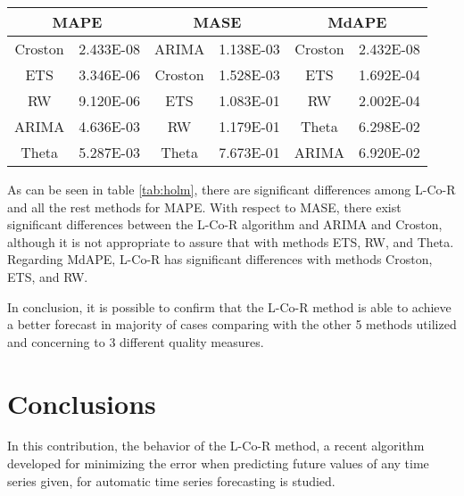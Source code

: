\documentclass[a4paper,twoside]{article}
\newcommand{\metodo}{L-Co-R}
\begin{document}
      \begin{table*}[h]
        \caption{Adjusted $p$ values of Holm's procedure between the control algorithm ({\metodo}) and the other methods for MAPE, MASE, and MdAPE. Values lower than $alpha=0.05$ indicate significant differences between {\metodo} and the corresponding algorithm.}
        \label{tab:holm}
        \centering
        \begin{tabular}{|c|c|c|c|c|c|}
         \hline \multicolumn{2}{|c|}{MAPE}   &  \multicolumn{2}{c|}{MASE}  &   \multicolumn{2}{c|}{MdAPE} \\
         \hline Croston &   2.433E-08   &   ARIMA   &   1.138E-03   &   Croston &   2.432E-08\\
         \hline ETS     &   3.346E-06   &   Croston &   1.528E-03   &   ETS     &   1.692E-04\\
         \hline RW      &   9.120E-06   &   ETS     &   1.083E-01   &   RW      &   2.002E-04\\
         \hline ARIMA	&	4.636E-03   &	RW      &   1.179E-01   &   Theta   &   6.298E-02\\
         \hline Theta	&	5.287E-03   &	Theta   &   7.673E-01   &   ARIMA   &   6.920E-02\\
         \hline
        \end{tabular}
    \end{table*}

    As can be seen in table \ref{tab:holm}, there are significant differences among {\metodo} and all the rest methods for MAPE. With respect to MASE, there exist significant differences between the {\metodo} algorithm and ARIMA and Croston, although it is not appropriate to assure that with methods ETS, RW, and Theta. Regarding MdAPE, {\metodo} has significant differences with methods Croston, ETS, and RW.

    In conclusion, it is possible to confirm that the {\metodo} method is able to achieve a better forecast in majority of cases comparing with the other 5 methods utilized and concerning to 3 different quality measures.


\section{Conclusions} 
\label{sec:conclusions}

\noindent In this contribution, the behavior of the {\metodo} method, a recent algorithm developed for minimizing the error when predicting future values of any time series given, for automatic time series forecasting is studied. 
\end{document}
